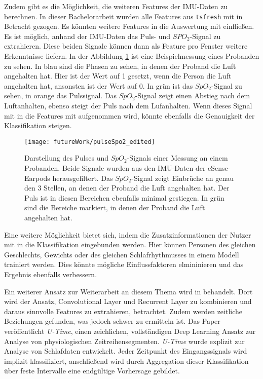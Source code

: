Zudem gibt es die Möglichkeit, die weiteren Features der IMU-Daten zu berechnen.
In dieser Bachelorarbeit wurden alle Features aus \texttt{tsfresh} mit in Betracht gezogen. 
Es könnten weitere Features in die Auswertung mit einfließen.
Es ist möglich, anhand der IMU-Daten das Puls- und $SPO_2$-Signal zu extrahieren. 
Diese beiden Signale können dann als Feature pro Fenster weitere Erkenntnisse liefern.
In der Abbildung \ref{futureWork:pulseSpo2} ist eine Beispielmessung eines Probanden zu sehen. 
In blau sind die Phasen zu sehen, in denen der Proband die Luft angehalten hat.
Hier ist der Wert auf 1 gesetzt, wenn die Person die Luft angehalten hat, ansonsten ist der Wert auf 0. 
In grün ist das $SpO_2$-Signal zu sehen, in orange das Pulssignal. 
Das $SpO_2$-Signal zeigt einen Abstieg nach dem Luftanhalten, ebenso steigt der Puls nach dem Lufanhalten.
Wenn dieses Signal mit in die Features mit aufgenommen wird, könnte ebenfalls die Genauigkeit der Klassifikation steigen. 
\begin{figure}[ht]
    \centering
    \texttt{[image: futureWork/pulseSpo2\_edited]}
    \caption{Darstellung des Pulses und $SpO_2$-Signals einer Messung an einem Probanden. Beide Signale wurden aus den IMU-Daten der eSense-Earpods herausgefiltert. Das $SpO_2$-Signal zeigt Einbrüche an genau den 3 Stellen, an denen der Proband die Luft angehalten hat. Der Puls ist in diesen Bereichen ebenfalls minimal gestiegen. In grün sind die Bereiche markiert, in denen der Proband die Luft angehalten hat.}
    \label{futureWork:pulseSpo2}
\end{figure}

Eine weitere Möglichkeit bietet sich, indem die Zusatzinformationen der Nutzer mit in die Klassifikation eingebunden werden.
Hier können Personen des gleichen Geschlechts, Gewichts oder des gleichen Schlafrhythmusses in einem Modell trainiert werden.
Dies könnte mögliche Einflussfaktoren elmininieren und das Ergebnis ebenfalls verbessern.

Ein weiterer Ansatz zur Weiterarbeit an diesem Thema wird in \cite{perslevUTimeFullyConvolutional2019} behandelt.
Dort wird der Ansatz, Convolutional Layer und Recurrent Layer zu kombinieren und daraus sinnvolle Features zu extrahieren, betrachtet. 
Zudem werden zeitliche Beziehungen gefunden, was jedoch schwer zu ermitteln ist. 
Das Paper veröffentlicht \textit{U-Time}, einen zeichlichen, vollständigen Deep Learning Ansatz zur Analyse von physiologischen Zeitreihensegmenten. 
\textit{U-Time} wurde explizit zur Analyse von Schlafdaten entwickelt.
Jeder Zeitpunkt des Eingangssignals wird implizit klassifiziert, anschließend wird durch Aggregation dieser Klassifikation über feste Intervalle eine endgültige Vorhersage gebildet.